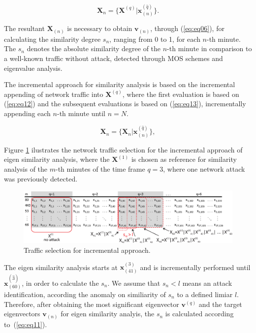 \begin{equation}\label{eq:eq12}
\boldsymbol{X}_{n} = \{\boldsymbol{X}^{(q)} | \boldsymbol{x}^{(\hat{q})}_{(n)}\}.
\end{equation}

The resultant $\boldsymbol{X}_{(n)}$ is necessary to obtain $\boldsymbol{v}_{(n)}$, through (\ref{eq:eq06}), for calculating the similarity degree $s_n$, ranging from 0 to 1, for each $n$-th minute. The $s_n$ denotes the absolute similarity degree of the $n$-th minute in comparison to a well-known traffic without attack, detected through MOS schemes and eigenvalue analysis.

The incremental approach for similarity analysis is based on the incremental appending of network traffic into $\boldsymbol{X}^{(q)}$, where the first evaluation is based on (\ref{eq:eq12}) and the subsequent evaluations is based on (\ref{eq:eq13}), incrementally appending each $n$-th minute until $n=N$.

\begin{equation}\label{eq:eq13}
\boldsymbol{X}_{n} = \{\boldsymbol{X}_{n} | \boldsymbol{x}^{(\hat{q})}_{(n)}\},
\end{equation}

Figure \ref{fig:2_fig8} ilustrates the network traffic selection for the incremental approach of eigen similarity analysis, where the $\boldsymbol{X}^{(1)}$ is chosen as reference for similarity analysis of the $m$-th minutes of the time frame $q=3$, where one network attack was previously detected. 

\begin{figure}[h!]
     \includegraphics[width=15cm]{figures/incremental.eps}
     \caption{Traffic selection for incremental approach.}
     \label{fig:2_fig8}
\end{figure}

The eigen similarity analysis starts at $\boldsymbol{x}^{(3)}_{(41)}$ and is incrementally performed until $\boldsymbol{x}^{(\hat{3})}_{(60)}$, in order to calculate the $s_n$. We assume that $s_n < l$ means an attack identification, according the anomaly on similiarity of $s_n$ to a defined limiar $l$. Therefore, after obtaining the most significant eigenvector $\boldsymbol{v}^{(q)}$ and the target eigenvectors $\boldsymbol{v}_{(n)}$ for eigen similarity analyis, the $s_n$ is calculated according to~(\ref{eq:eq11}).

